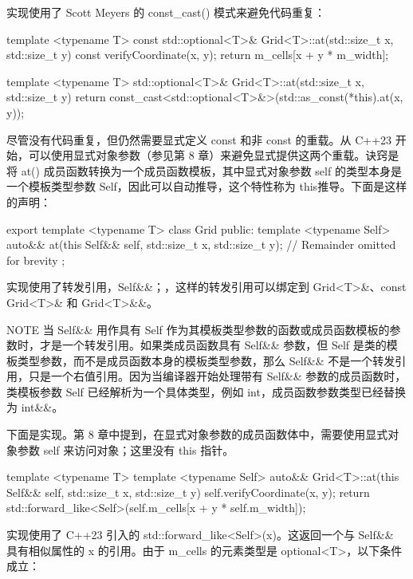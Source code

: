 实现使用了 Scott Meyers 的 const\_cast() 模式来避免代码重复：

\begin{cpp}
template <typename T>
const std::optional<T>& Grid<T>::at(std::size_t x, std::size_t y) const
{
    verifyCoordinate(x, y);
    return m_cells[x + y * m_width];
}

template <typename T>
std::optional<T>& Grid<T>::at(std::size_t x, std::size_t y)
{
    return const_cast<std::optional<T>&>(std::as_const(*this).at(x, y));
}
\end{cpp}

尽管没有代码重复，但仍然需要显式定义 const 和非 const 的重载。从 C++23 开始，可以使用显式对象参数（参见第 8 章）来避免显式提供这两个重载。诀窍是将 at() 成员函数转换为一个成员函数模板，其中显式对象参数 self 的类型本身是一个模板类型参数 Self，因此可以自动推导，这个特性称为 this推导。下面是这样的声明：

\begin{cpp}
export template <typename T>
class Grid
{
    public:
        template <typename Self>
        auto&& at(this Self&& self, std::size_t x, std::size_t y);
        // Remainder omitted for brevity
};
\end{cpp}

实现使用了转发引用，Self\&\&；，这样的转发引用可以绑定到 Grid<T>\&、const Grid<T>\& 和 Grid<T>\&\&。

\begin{myNotic}{NOTE}
当 Self\&\& 用作具有 Self 作为其模板类型参数的函数或成员函数模板的参数时，才是一个转发引用。如果类成员函数具有 Self\&\& 参数，但 Self 是类的模板类型参数，而不是成员函数本身的模板类型参数，那么 Self\&\& 不是一个转发引用，只是一个右值引用。因为当编译器开始处理带有 Self\&\& 参数的成员函数时，类模板参数 Self 已经解析为一个具体类型，例如 int，成员函数参数类型已经替换为 int\&\&。
\end{myNotic}

下面是实现。第 8 章中提到，在显式对象参数的成员函数体中，需要使用显式对象参数 self 来访问对象；这里没有 this 指针。

\begin{cpp}
template <typename T>
template <typename Self>
auto&& Grid<T>::at(this Self&& self, std::size_t x, std::size_t y)
{
    self.verifyCoordinate(x, y);
    return std::forward_like<Self>(self.m_cells[x + y * self.m_width]);
}
\end{cpp}

实现使用了 C++23 引入的 std::forward\_like<Self>(x)。这返回一个与 Self\&\& 具有相似属性的 x 的引用。由于 m\_cells 的元素类型是 optional<T>，以下条件成立：

